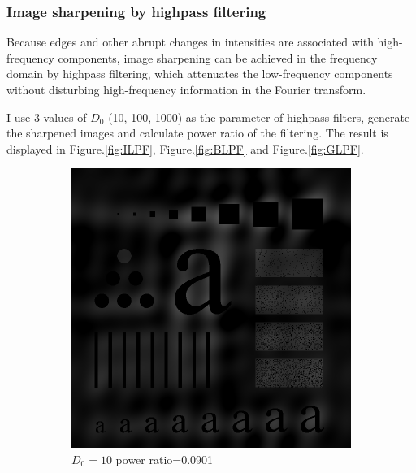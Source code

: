 \subsubsection{Image sharpening by highpass filtering}
Because edges and other abrupt changes in intensities are associated with high-frequency components, image sharpening can be achieved in the frequency domain by highpass filtering, which attenuates the low-frequency components without disturbing high-frequency information in the Fourier transform.

I use 3 values of $D_0$ (10, 100, 1000) as the parameter of highpass filters, generate the sharpened images and calculate power ratio of the filtering. The result is displayed in Figure.\ref{fig:ILPF}, Figure.\ref{fig:BLPF} and Figure.\ref{fig:GLPF}.

\begin{figure}[h!]
	\centering
	\begin{subfigure}[b]{0.3\linewidth}
		\includegraphics[width=\linewidth]{myfigure/p3/IHPF_10.png}
		\caption{$D_0=10$ power ratio=0.0901}
		\label{fig:IHPF_10}
	\end{subfigure}
  	\begin{subfigure}[b]{0.3\linewidth}

\end{subfigure}
\end{figure}
